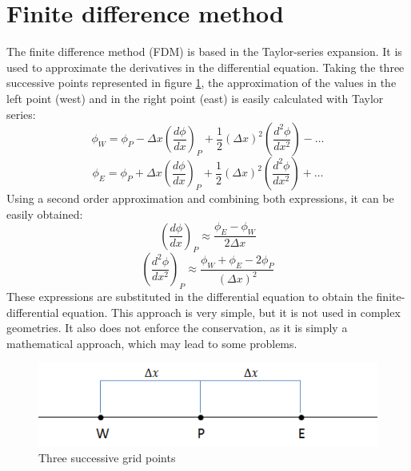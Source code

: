 \section{Finite difference method}
The finite difference method (FDM) is based in the Taylor-series expansion. It is used to approximate the derivatives in the differential equation. Taking the three successive points represented in figure \ref{3gridpoints}, the approximation of the values in the left point (west) and in the right point (east) is easily calculated with Taylor series:
\begin{equation}
\phi_{W}=\phi_{P}-\Delta x\left(\frac{d\phi}{dx}\right)_{P}+\frac{1}{2}\left(\Delta x\right)^{2}\left(\frac{d^{2}\phi}{dx^{2}}\right)-\dots
\end{equation}
\begin{equation}
\phi_{E}=\phi_{P}+\Delta x\left(\frac{d\phi}{dx}\right)_{P}+\frac{1}{2}\left(\Delta x\right)^{2}\left(\frac{d^{2}\phi}{dx^{2}}\right)+\dots
\end{equation}
Using a second order approximation and combining both expressions, it can be easily obtained:
\begin{equation}
\left(\frac{d\phi}{dx}\right)_{P}\approx\frac{\phi_{E}-\phi_{W}}{2\Delta x}
\end{equation}
\begin{equation}
\left(\frac{d^{2}\phi}{dx^{2}}\right)_{P}\approx\frac{\phi_{W}+\phi_{E}-2\phi_{P}}{\left(\Delta x\right)^{2}}
\end{equation}
These expressions are substituted in the differential equation to obtain the finite-differential equation. This approach is very simple, but it is not used in complex geometries. It also does not enforce the conservation, as it is simply a mathematical approach, which may lead to some problems.
\begin{figure}
	\centering
	\includegraphics[]{StateArt/3gridpoints}
	\caption{Three successive grid points}
	\label{3gridpoints}
\end{figure}

